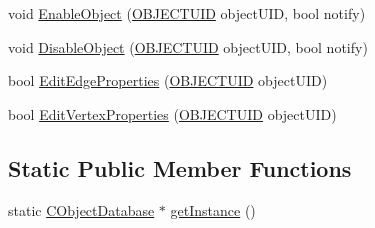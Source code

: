 \begin{DoxyCompactItemize}
\item 
void \hyperlink{class_n_m_1_1_o_d_b_1_1_c_object_database_a1db6ac491616398bc7e77b0ce8303c65}{Enable\+Object} (\hyperlink{namespace_n_m_1_1_o_d_b_a262b64fab56baaa96e18bac4ada88265}{O\+B\+J\+E\+C\+T\+U\+I\+D} object\+U\+I\+D, bool notify)
\item 
void \hyperlink{class_n_m_1_1_o_d_b_1_1_c_object_database_a56358106b2004a9ecce8c090244cc772}{Disable\+Object} (\hyperlink{namespace_n_m_1_1_o_d_b_a262b64fab56baaa96e18bac4ada88265}{O\+B\+J\+E\+C\+T\+U\+I\+D} object\+U\+I\+D, bool notify)
\item 
bool \hyperlink{class_n_m_1_1_o_d_b_1_1_c_object_database_ae6e500bed86f03100adc8c2fe1ab8db1}{Edit\+Edge\+Properties} (\hyperlink{namespace_n_m_1_1_o_d_b_a262b64fab56baaa96e18bac4ada88265}{O\+B\+J\+E\+C\+T\+U\+I\+D} object\+U\+I\+D)
\item 
bool \hyperlink{class_n_m_1_1_o_d_b_1_1_c_object_database_a1a46c42d2e78424571a8075d13f8a98c}{Edit\+Vertex\+Properties} (\hyperlink{namespace_n_m_1_1_o_d_b_a262b64fab56baaa96e18bac4ada88265}{O\+B\+J\+E\+C\+T\+U\+I\+D} object\+U\+I\+D)
\end{DoxyCompactItemize}
\subsection*{Static Public Member Functions}
\begin{DoxyCompactItemize}
\item 
static \hyperlink{class_n_m_1_1_o_d_b_1_1_c_object_database}{C\+Object\+Database} $\ast$ \hyperlink{class_n_m_1_1_o_d_b_1_1_c_object_database_a07e82547df5c70e6d6c97ae93b324f0d}{get\+Instance} ()
\end{DoxyCompactItemize}
